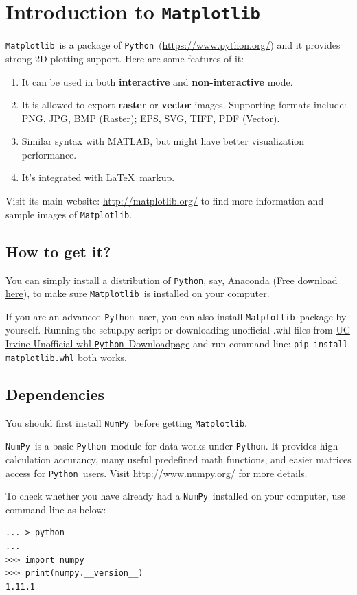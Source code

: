 \documentclass{report}
\newcommand{\pkg}[1]{\texttt{#1}}
\newcommand{\Py}{\pkg{Python}}
\newcommand{\NumPy}{\pkg{NumPy}}
\newcommand{\mpl}{\texttt{Matplotlib}}
\newcommand{\Emph}[1]{\textcolor{cyan!80!white}{{\bfseries #1}}}
\begin{document}
\vfill\clearpage

\tableofcontents

\chapter{Introduction to \mpl}
\mpl\ is a package of \Py\ (\url{https://www.python.org/}) and it provides strong 2D plotting support. Here are some features of it:
\begin{enumerate}
\item It can be used in both \Emph{interactive} and \Emph{non-interactive} mode.
\item It is allowed to export \Emph{raster} or \Emph{vector} images. Supporting formats include: PNG, JPG, BMP (Raster); EPS, SVG, TIFF, PDF (Vector).
\item Similar syntax with MATLAB, but might have better visualization performance.
\item It's integrated with \LaTeX\ markup.
\end{enumerate}

Visit its main website: \url{http://matplotlib.org/} to find more information and sample images of \mpl . 

\section{How to get it?}
You can simply install a distribution of \Py, say, Anaconda (\href{https://www.continuum.io/downloads}{Free download here}), to make sure \mpl\ is installed on your computer. 

If you are an advanced \Py\ user, you can also install \mpl\ package by yourself. Running the setup.py script or downloading unofficial .whl files from \href{http://www.lfd.uci.edu/~gohlke/pythonlibs/#matplotlib}{UC Irvine Unofficial whl \Py\ Downloadpage} and run command line: \texttt{pip install matplotlib.whl} both works.

\section{Dependencies}
You should first install \NumPy\ before getting \mpl .

\NumPy\ is a basic \Py\ module for data works under \Py . It provides high calculation accurancy, many useful predefined math functions, and easier matrices access for \Py\ users. Visit \url{http://www.numpy.org/} for more details.

To check whether you have already had a \NumPy\ installed on your computer, use command line as below:
\begin{verbatim}
... > python
...
>>> import numpy
>>> print(numpy.__version__)
1.11.1
\end{verbatim}
\end{document}
